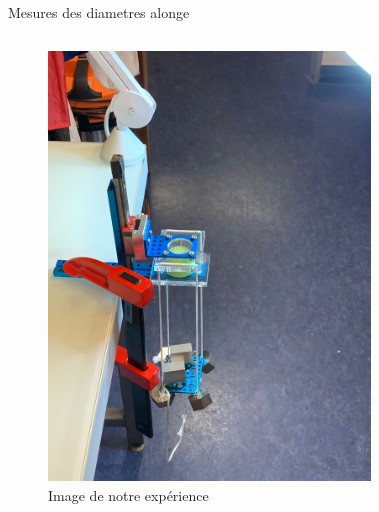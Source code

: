 \begin{frame}{Mesures des diametres alonge}
\begin{columns}
\begin{figure}
            \includegraphics[height=0.65\textheight]{IMG-20221205-WA0027.jpg}
            \caption{Image de notre expérience}
            \label{fig:my_label}
        \end{figure}
        \begin{figure}
            \centering

\end{figure}
\end{columns}
\end{frame}
